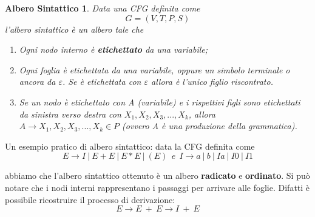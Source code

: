 \documentclass[11pt]{article}
\newtheorem{alberoSintattico}{Albero Sintattico}
\begin{document}
\begin{alberoSintattico}
Data una CFG definita come $$G=(V,T,P,S)$$ l'albero sintattico è un albero tale che
\begin{enumerate}
	\item Ogni nodo interno è \textbf{etichettato} da una variabile;
	\item Ogni foglia è etichettata da una variabile, oppure un simbolo terminale o ancora da $\varepsilon$. Se è etichettata con $\varepsilon$ allora è l'unico figlio riscontrato.
	\item Se un nodo è etichettato con A (variabile) e i rispettivi figli sono etichettati da sinistra verso destra con $X_1,X_2,X_3,...,X_k$, allora $A \rightarrow X_1,X_2,X_3,...,X_k \in P$ (ovvero A è una produzione della grammatica).
\end{enumerate}
\end{alberoSintattico}

Un esempio pratico di albero sintattico: data la CFG definita come
\begin{equation}
E \rightarrow I\medspace |\medspace E+ E\medspace |\medspace E*E\medspace |\medspace (E)\medspace \medspace e \medspace \medspace I \rightarrow a\medspace |\medspace b \medspace |\medspace Ia\medspace |\medspace I0\medspace |\medspace I1
\end{equation}


\begin{center}
\end{center}
abbiamo che l'albero sintattico ottenuto è un albero \textbf{radicato} e \textbf{ordinato}. Si può notare che i \color{blue}nodi interni \color{black} rappresentano i passaggi per arrivare alle \color{red}foglie\color{black}. Difatti è possibile ricostruire il processo di derivazione: $$E \rightarrow E \medspace + \medspace E \rightarrow I \medspace + \medspace E$$
\end{document}
